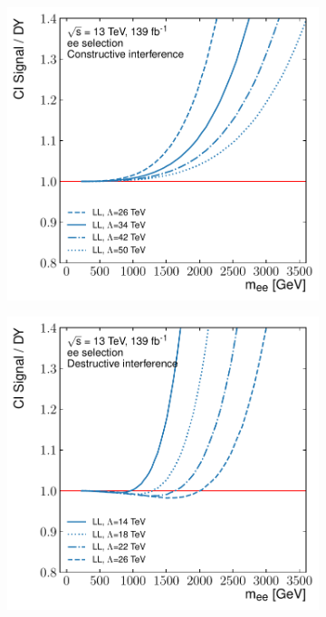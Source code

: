 \begin{figure}[]
    \centering
    \begin{subfigure}[b]{0.49\textwidth}
        \centering
        \includegraphics[width=\textwidth]{figures/analysis/datamc/sigmodel/fit-const-ee-backgroundModel.pdf}
        \caption{}
        \label{fig:datamc:sigShape1}
    \end{subfigure}
    \begin{subfigure}[b]{0.49\textwidth}
        \centering
        \includegraphics[width=\textwidth]{figures/analysis/datamc/sigmodel/fit-dest-ee-backgroundModel.pdf}

\end{subfigure}
\end{figure}
